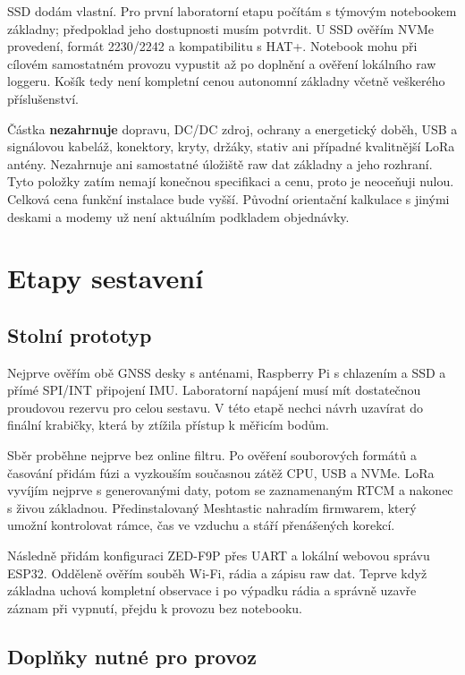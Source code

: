 SSD dodám vlastní. Pro první laboratorní etapu počítám s týmovým
notebookem základny; předpoklad jeho dostupnosti musím potvrdit.
U SSD ověřím NVMe provedení, formát 2230/2242 a kompatibilitu s HAT+.
Notebook mohu při cílovém samostatném provozu vypustit až po doplnění
a ověření lokálního raw loggeru. Košík tedy není kompletní cenou
autonomní základny včetně veškerého příslušenství.

Částka \textbf{nezahrnuje} dopravu, DC/DC zdroj, ochrany a energetický
doběh, USB a signálovou kabeláž, konektory, kryty, držáky, stativ ani
případné kvalitnější LoRa antény. Nezahrnuje ani samostatné úložiště
raw dat základny a jeho rozhraní. Tyto položky zatím nemají konečnou
specifikaci a cenu, proto je neoceňuji nulou. Celková cena funkční instalace
bude vyšší. Původní orientační kalkulace s jinými deskami a modemy už není
aktuálním podkladem objednávky.

\section{Etapy sestavení}

\subsection{Stolní prototyp}

Nejprve ověřím obě GNSS desky s anténami, Raspberry Pi s chlazením a SSD
a přímé SPI/INT připojení IMU. Laboratorní napájení musí mít dostatečnou
proudovou rezervu pro celou sestavu. V této etapě nechci návrh uzavírat do
finální krabičky, která by ztížila přístup k měřicím bodům.

Sběr proběhne nejprve bez online filtru. Po ověření souborových formátů a
časování přidám fúzi a vyzkouším současnou zátěž CPU, USB a NVMe. LoRa
vyvíjím nejprve s generovanými daty, potom se zaznamenaným RTCM a nakonec
s živou základnou. Předinstalovaný Meshtastic nahradím firmwarem, který
umožní kontrolovat rámce, čas ve vzduchu a stáří přenášených korekcí.

Následně přidám konfiguraci ZED-F9P přes UART a lokální webovou správu
ESP32. Odděleně ověřím souběh Wi-Fi, rádia a zápisu raw dat. Teprve když
základna uchová kompletní observace i po výpadku rádia a správně uzavře
záznam při vypnutí, přejdu k provozu bez notebooku.

\subsection{Doplňky nutné pro provoz}

